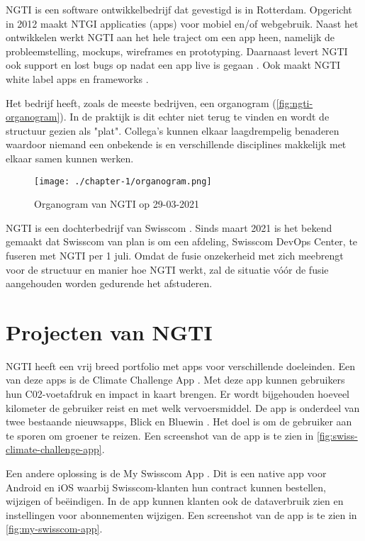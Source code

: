 
NGTI is een software ontwikkelbedrijf dat gevestigd is in Rotterdam. Opgericht in 2012 maakt NTGI applicaties (apps) voor mobiel en/of webgebruik. Naast het ontwikkelen werkt NGTI aan het hele traject om een app heen, namelijk de probleemstelling, mockups, wireframes en prototyping. Daarnaast levert NGTI ook support en lost bugs op nadat een app live is gegaan \cite{ngti-services}. Ook maakt NGTI white label apps en frameworks \cite{ngti-solutions}.

Het bedrijf heeft, zoals de meeste bedrijven, een organogram (\autoref{fig:ngti-organogram}). In de praktijk is dit echter niet terug te vinden en wordt de structuur gezien als "plat". Collega's kunnen elkaar laagdrempelig benaderen waardoor niemand een onbekende is en verschillende disciplines makkelijk met elkaar samen kunnen werken.  

\begin{figure}[hbt!]
  \centering
  \texttt{[image: ./chapter-1/organogram.png]}
  \caption{Organogram van NGTI op 29-03-2021 \cite{ngti-organogram}}
  \label{fig:ngti-organogram}
\end{figure}

NGTI is een dochterbedrijf van Swisscom \cite{swisscom-other-division}. Sinds maart 2021 is het bekend gemaakt dat Swisscom van plan is om een afdeling, Swisscom DevOps Center, te fuseren met NGTI per 1 juli. Omdat de fusie onzekerheid met zich meebrengt voor de structuur en manier hoe NGTI werkt, zal de situatie vóór de fusie aangehouden worden gedurende het afstuderen.

\section{Projecten van NGTI}\label{sec:ch1-projecten-van-ngti}
NGTI heeft een vrij breed portfolio met apps voor verschillende doeleinden. Een van deze apps is de Climate Challenge App \cite{ngti-swisscom-climate-challenge}. Met deze app kunnen gebruikers hun C02-voetafdruk en impact in kaart brengen. Er wordt bijgehouden hoeveel kilometer de gebruiker reist en met welk vervoersmiddel. De app is onderdeel van twee bestaande nieuwsapps, Blick en Bluewin \cite{swisscom-climate-challenge-integration}. Het doel is om de gebruiker aan te sporen om groener te reizen. Een screenshot van de app is te zien in \autoref{fig:swiss-climate-challenge-app}.

Een andere oplossing is de My Swisscom App \cite{ngti-my-swisscom-app}. Dit is een native app voor Android en iOS waarbij Swisscom-klanten hun contract kunnen bestellen, wijzigen of beëindigen. In de app kunnen klanten ook de dataverbruik zien en instellingen voor abonnementen wijzigen. Een screenshot van de app is te zien in \autoref{fig:my-swisscom-app}.

